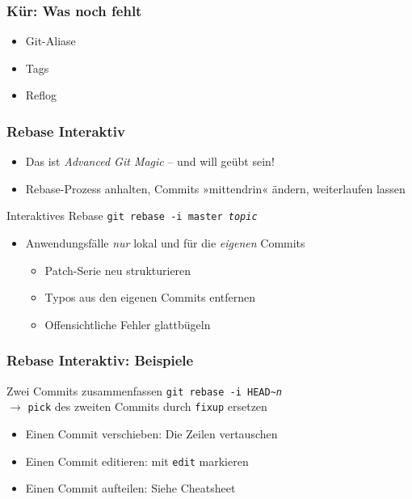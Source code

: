 \documentclass{beamer}
\begin{document}
\begin{frame}
\frametitle{Kür: Was noch fehlt}
\begin{itemize}
	\item Git-Aliase
	\item Tags
	\item Reflog
\end{itemize}


\end{frame}


\begin{frame}
\frametitle{Rebase Interaktiv}
\begin{itemize}
	\item Das ist \emph{Advanced Git Magic} -- und will geübt sein!
	\item Rebase-Prozess anhalten, Commits »mittendrin« ändern, weiterlaufen lassen
\end{itemize}

\begin{block}{Interaktives Rebase}
\texttt{git rebase -i master \emph{topic}}
\end{block}

\begin{itemize}
	\item Anwendungsfälle \emph{nur} lokal und für die \emph{eigenen} Commits
\begin{itemize}
	\item Patch-Serie neu strukturieren
	\item Typos aus den eigenen Commits entfernen
	\item Offensichtliche Fehler glattbügeln
\end{itemize}
\end{itemize}
\end{frame}

\begin{frame}
\frametitle{Rebase Interaktiv: Beispiele}



\begin{block}{Zwei Commits zusammenfassen}
\texttt{git rebase -i HEAD\textasciitilde{}\emph{n}}\\
$\rightarrow$ \texttt{pick} des zweiten Commits durch \texttt{fixup} ersetzen
\end{block}

\begin{itemize}
	\item Einen Commit verschieben: Die Zeilen vertauschen
	\item Einen Commit editieren: mit \texttt{edit} markieren
	\item Einen Commit aufteilen: Siehe Cheatsheet
\end{itemize}
\end{frame}
\end{document}
